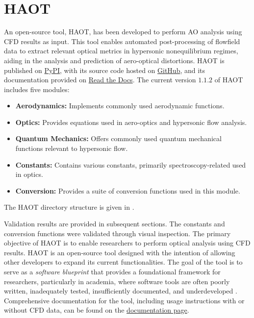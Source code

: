 \section{\acrfull{HAOT}\label{ch3:haot}}
An open-source tool, \gls{HAOT}, has been developed to perform \gls{AO}
analysis using \gls{CFD} results as input. This tool enables automated
post-processing of flowfield data to extract relevant optical metrics in
hypersonic nonequilibrium regimes, aiding in the analysis and prediction of
aero-optical distortions. \gls{HAOT} is published on
\href{https://pypi.org/project/haot/}{PyPI}, with its source code hosted on
\href{https://github.com/mliza/HAOT}{GitHub}, and its documentation provided on
\href{https://haot.readthedocs.io/en/latest/}{Read the Docs}. The current
version $1.1.2$ of \gls{HAOT} includes five modules:
\begin{itemize} 
\item \textbf{Aerodynamics:} Implements commonly used aerodynamic functions.
\item \textbf{Optics:} Provides equations used in aero-optics and hypersonic
    flow analysis.
\item \textbf{Quantum Mechanics:} Offers commonly used quantum mechanical
    functions relevant to hypersonic flow.
\item \textbf{Constants:} Contains various constants, primarily
    spectroscopy-related used in optics.
\item \textbf{Conversion:} Provides a suite of conversion functions used in
    this module. 
\end{itemize}
The \gls{HAOT} directory structure is given in .


Validation results are provided in subsequent sections. The constants and
conversion functions were validated through visual inspection. The primary
objective of \gls{HAOT} is to enable researchers to perform optical analysis
using \gls{CFD} results. \gls{HAOT} is an open-source tool designed with the
intention of allowing other developers to expand its current functionalities.
The goal of the tool is to serve as a \textit{software blueprint} that provides
a foundational framework for researchers, particularly in academia, where
software tools are often poorly written, inadequately tested, insufficiently
documented, and underdeveloped \cite{Robillard1998,Liu2008}. Comprehensive
documentation for the tool, including usage instructions with or without
\gls{CFD} data, can be found on the
\href{https://haot.readthedocs.io/en/latest/}{documentation page}. \\

